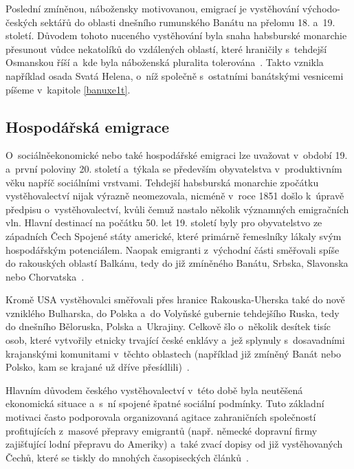 Poslední zmíněnou, nábožensky motivovanou, emigrací je vystěhování východo-českých sektářů do oblasti dnešního rumunského Banátu na přelomu 18. a~19. století. Důvodem tohoto nuceného vystěhování byla snaha habsburské monarchie přesunout vůdce nekatolíků do vzdálených oblastí, které hraničily s~tehdejší Osmanskou říší a~kde byla náboženská pluralita tolerována~\parencite{Nespor2005}. Takto vznikla například osada Svatá Helena, o~níž společně s~ostatními banátskými vesnicemi píšeme v~kapitole \ref{banuxe1t}.

\hypertarget{hospoduxe1ux159skuxe1-emigrace}{%
\subsection{Hospodářská emigrace}\label{hospoduxe1ux159skuxe1-emigrace}}

O~sociálněekonomické nebo také hospodářské emigraci lze uvažovat v~období 19. a~první poloviny 20. století a~týkala se především obyvatelstva v~produktivním věku napříč sociálními vrstvami. Tehdejší habsburská monarchie zpočátku vystěhovalectví nijak výrazně neomezovala, nicméně v~roce 1851 došlo k~úpravě předpisu o~vystěhovalectví, kvůli čemuž nastalo několik významných emigračních vln. Hlavní destinací na počátku 50. let 19. století byly pro obyvatelstvo ze západních Čech Spojené státy americké, které primárně řemeslníky lákaly svým hospodářským potenciálem. Naopak emigranti z~východní části směřovali spíše do rakouských oblastí Balkánu, tedy do již zmíněného Banátu, Srbska, Slavonska nebo Chorvatska~\parencite{Vaculik2009b}.

Kromě USA vystěhovalci směřovali přes hranice Rakouska-Uherska také do nově vzniklého Bulharska, do Polska a~do Volyňské gubernie tehdejšího Ruska, tedy do dnešního Běloruska, Polska a~Ukrajiny. Celkově šlo o~několik desítek tisíc osob, které vytvořily etnicky trvající české enklávy a~jež splynuly s~dosavadními krajanskými komunitami v~těchto oblastech (například již zmíněný Banát nebo Polsko, kam se krajané už dříve přesídlili)~\parencite{Nespor2005}.

Hlavním důvodem českého vystěhovalectví v~této době byla neutěšená ekonomická situace a~s~ní spojené špatné sociální podmínky. Tuto základní motivaci často podporovala organizovaná agitace zahraničních společností profitujících z~masové přepravy emigrantů (např. německé dopravní firmy zajišťující lodní přepravu do Ameriky) a~také zvací dopisy od již vystěhovaných Čechů, které se tiskly do mnohých časopiseckých článků~\parencite{Vaculik2009a}.

